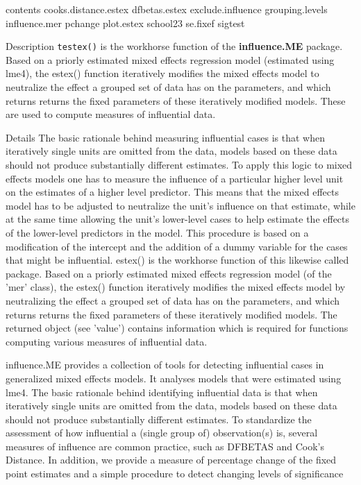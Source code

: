 contents
cooks.distance.estex  
dfbetas.estex 
exclude.influence  
grouping.levels  
influence.mer 
pchange  
plot.estex 
school23  
se.fixef  
sigtest 

Description
\texttt{testex()} is the workhorse function of the \textbf{influence.ME} package. Based on a priorly estimated mixed effects regression model (estimated using lme4), the estex() function iteratively modifies the mixed effects model to neutralize the effect a grouped set of data has on the parameters, and which returns returns the fixed parameters of these iteratively modified models. These are used to compute measures of influential data.

Details
The basic rationale behind measuring influential cases is that when iteratively single units are omitted from the data, models based on these data should not produce substantially different estimates. To apply this logic to mixed effects models one has to measure the influence of a particular higher level unit on the estimates of a higher level predictor. This means that the mixed effects model has to be adjusted to neutralize the unit's influence on that estimate, while at the same time allowing the unit's lower-level cases to help estimate the effects of the lower-level predictors in the model. This procedure is based on a modification of the intercept and the addition of a dummy variable for the cases that might be influential. estex() is the workhorse function of this likewise called package. Based on a priorly estimated mixed effects regression model (of the 'mer' class), the estex() function iteratively modifies the mixed effects model by neutralizing the effect a grouped set of data has on the parameters, and which returns returns the fixed parameters of these iteratively modified models. The returned object (see 'value') contains information which is required for functions computing various measures of influential data.

influence.ME provides a collection of tools for detecting influential cases in generalized mixed effects models. It analyses models that were estimated using lme4. The basic rationale behind identifying influential data is that when iteratively single units are omitted from the data, models based on these data should not produce substantially different estimates. To standardize the assessment of how influential a (single group of) observation(s) is, several measures of influence are common practice, such as DFBETAS and Cook's Distance. In addition, we provide a measure of percentage change of the fixed point estimates and a simple procedure to detect changing levels of significance


